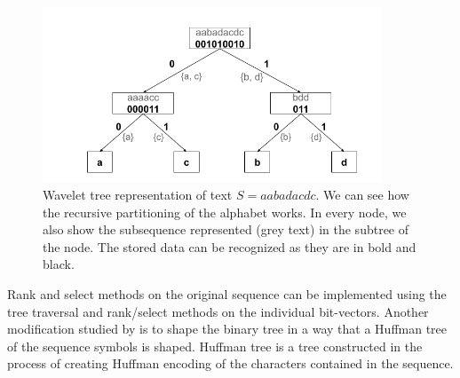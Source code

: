 \begin{figure}
	\centerline{
		\includegraphics[width=0.9\textwidth, height=0.3\textheight]{images/wavelet_tree}
	}
	\caption[TODO]{Wavelet tree representation of text $S=aabadacdc$. We can see how the
	recursive partitioning of the alphabet works. In every node, we also show the
	subsequence represented (grey text) in the subtree of the node. The stored data can be
	recognized as they are in bold and black.
	}
	\label{obr:WaveletTreeExample}
\end{figure}

Rank and select methods on the original sequence can be implemented using the tree
traversal and rank/select methods on the individual bit-vectors. Another modification
studied by \cite{makinen2005succinct} is to shape the binary tree in a way that a Huffman
tree of the sequence symbols is shaped. Huffman tree is a tree constructed in the
process of creating Huffman encoding of the characters contained in the sequence.